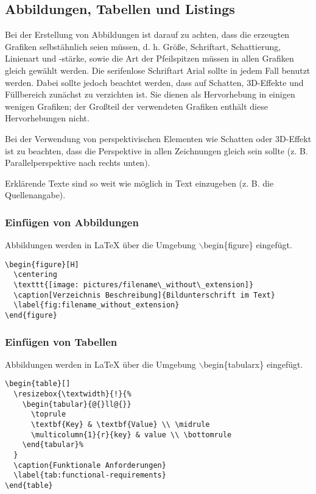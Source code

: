 \subsection{Abbildungen, Tabellen und Listings}
Bei der Erstellung von Abbildungen ist darauf zu achten, dass die erzeugten Grafiken selbstähnlich seien müssen, d. h. Größe, Schriftart, Schattierung, Linienart und -stärke, sowie die Art der Pfeilspitzen müssen in allen Grafiken gleich gewählt werden. Die serifenlose Schriftart Arial sollte in jedem Fall benutzt werden. Dabei sollte jedoch beachtet werden, dass auf Schatten, 3D-Effekte  und Füllbereich zunächst zu verzichten ist. Sie dienen als Hervorhebung in einigen wenigen Grafiken; der Großteil der verwendeten Grafiken enthält diese Hervorhebungen nicht.

Bei der Verwendung von perspektivischen Elementen wie Schatten oder 3D-Effekt ist zu beachten, dass die Perspektive in allen Zeichnungen gleich sein sollte (z. B. Parallelperspektive nach rechts unten).

Erklärende Texte sind so weit wie möglich in Text einzugeben (z. B. die Quellenangabe).

\subsubsection{Einfügen von Abbildungen}
Abbildungen werden in \LaTeX{} über die Umgebung $\backslash$begin\{figure\} eingefügt.

\begin{lstlisting}[caption={Quelltext für eine Abbildung},label=lst:source-code-listing]
\begin{figure}[H]
  \centering
  \texttt{[image: pictures/filename\_without\_extension]}
  \caption[Verzeichnis Beschreibung]{Bildunterschrift im Text}
  \label{fig:filename_without_extension}
\end{figure}
\end{lstlisting}

\subsubsection{Einfügen von Tabellen}
Abbildungen werden in \LaTeX{} über die Umgebung $\backslash$begin\{tabularx\} eingefügt.

\begin{lstlisting}[caption={Quelltext für eine Tabelle},label=lst:source-code-table]
\begin{table}[]
  \resizebox{\textwidth}{!}{%
    \begin{tabular}{@{}ll@{}}
      \toprule
      \textbf{Key} & \textbf{Value} \\ \midrule
      \multicolumn{1}{r}{key} & value \\ \bottomrule
    \end{tabular}%
  }
  \caption{Funktionale Anforderungen}
  \label{tab:functional-requirements}
\end{table}
\end{lstlisting}

